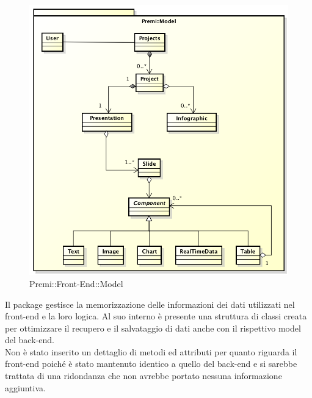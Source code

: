 \begin{figure}[h]
	\centering
	\includegraphics[width=0.7\linewidth]{img/premi_model}
	\caption[Premi::Front-End::Model]{Premi::Front-End::Model}
\end{figure}
Il package gestisce la memorizzazione delle informazioni dei dati utilizzati nel \gls{front-end} e la loro logica. Al suo interno è presente una struttura di classi creata per ottimizzare il recupero e il salvataggio di dati anche con il rispettivo model del \gls{back-end}.\\
Non è stato inserito un dettaglio di metodi ed attributi per quanto riguarda il \gls{front-end} poiché è stato mantenuto identico a quello del \gls{back-end} e si sarebbe trattata di una ridondanza che non avrebbe portato nessuna informazione aggiuntiva.
